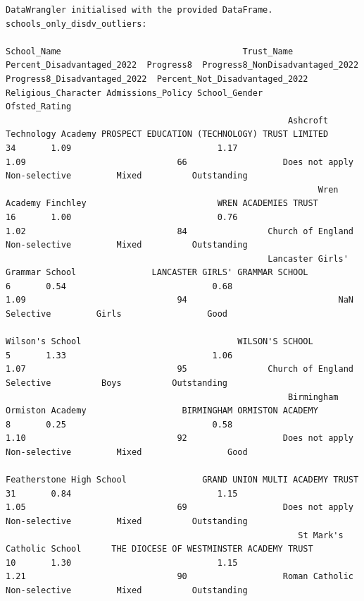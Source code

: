 \documentclass[
  letterpaper,
  DIV=11,
  numbers=noendperiod]{scrartcl}
\begin{document}
\begin{verbatim}
DataWrangler initialised with the provided DataFrame.
schools_only_disdv_outliers:
                                                                        School_Name                                    Trust_Name  Percent_Disadvantaged_2022  Progress8  Progress8_NonDisadvantaged_2022  Progress8_Disadvantaged_2022  Percent_Not_Disadvantaged_2022              Religious_Character Admissions_Policy School_Gender        Ofsted_Rating
                                                        Ashcroft Technology Academy PROSPECT EDUCATION (TECHNOLOGY) TRUST LIMITED                          34       1.09                             1.17                          1.09                              66                   Does not apply     Non-selective         Mixed          Outstanding
                                                              Wren Academy Finchley                          WREN ACADEMIES TRUST                          16       1.00                             0.76                          1.02                              84                Church of England     Non-selective         Mixed          Outstanding
                                                    Lancaster Girls' Grammar School               LANCASTER GIRLS' GRAMMAR SCHOOL                           6       0.54                             0.68                          1.09                              94                              NaN         Selective         Girls                 Good
                                                                    Wilson's School                               WILSON'S SCHOOL                           5       1.33                             1.06                          1.07                              95                Church of England         Selective          Boys          Outstanding
                                                        Birmingham Ormiston Academy                   BIRMINGHAM ORMISTON ACADEMY                           8       0.25                             0.58                          1.10                              92                   Does not apply     Non-selective         Mixed                 Good
                                                           Featherstone High School               GRAND UNION MULTI ACADEMY TRUST                          31       0.84                             1.15                          1.05                              69                   Does not apply     Non-selective         Mixed          Outstanding
                                                          St Mark's Catholic School      THE DIOCESE OF WESTMINSTER ACADEMY TRUST                          10       1.30                             1.15                          1.21                              90                   Roman Catholic     Non-selective         Mixed          Outstanding

\end{verbatim}
\end{document}
